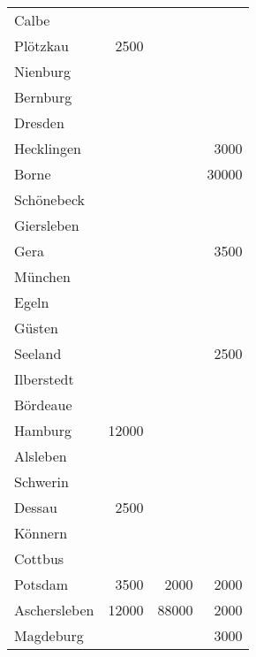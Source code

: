           \begin{center}
            \begin{small}
              \tablehead{}
              \begin{oraclesql}
                \begin{supertabular}{lrrr}
                  Calbe &  &  &  \\
                  Plötzkau & 2500 &  &  \\
                  Nienburg &  &  &  \\
                  Bernburg &  &  &  \\
                  Dresden &  &  &  \\
                  Hecklingen &  &  & 3000 \\
                  Borne &  &  & 30000 \\
                  Schönebeck &  &  &  \\
                  Giersleben &  &  &  \\
                  Gera &  &  & 3500 \\
                  München &  &  &  \\
                  Egeln &  &  &  \\
                  Güsten &  &  &  \\
                  Seeland &  &  & 2500 \\
                  Ilberstedt &  &  &  \\
                  Bördeaue &  &  &  \\
                  Hamburg & 12000 &  &  \\
                  Alsleben &  &  &  \\
                  Schwerin &  &  &  \\
                  Dessau & 2500 &  &  \\
                  Könnern &  &  &  \\
                  Cottbus &  &  &  \\
                  Potsdam & 3500 & 2000 & 2000 \\
                  Aschersleben & 12000 & 88000 & 2000 \\
                  Magdeburg &  &  & 3000 \\
                \end{supertabular}
              \end{oraclesql}
            \end{small}
          \end{center}
